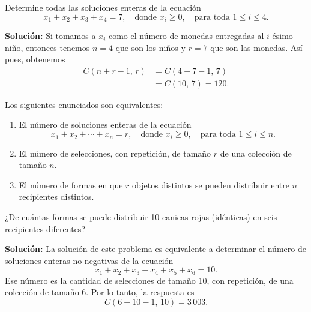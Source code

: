 \begin{myexample}
    Determine todas las soluciones enteras de la ecuación
    $$x_1 + x_2 + x_3 + x_4 = 7, \quad \text{donde } x_i \geq 0, \quad \text{para toda } 1 \leq i \leq 4.$$

    \tcblower
    \textbf{\color{jblueleft}Solución:} Si tomamos a $x_i$ como el número de monedas entregadas al $i$-ésimo niño, entonces tenemos $n = 4$ que son los niños y $r = 7$ que son las monedas. Así pues, obtenemos
    \begin{align*}
        C(n + r - 1, \, r) & = C(4 + 7 - 1, \, 7) \\
        & = C(10, \, 7) = 120.
    \end{align*}
\end{myexample}

\begin{BOX}
    Los siguientes enunciados son equivalentes:
    \begin{enumerate}[label=\alph*)]
        \item El número de soluciones enteras de la ecuación
        $$x_1 + x_2 + \cdots + x_n = r, \quad \text{donde } x_i \geq 0, \quad \text{para toda } 1 \leq i \leq n.$$
        \item El número  de selecciones, con repetición, de tamaño $r$ de una colección de tamaño $n$.
        \item  El número de formas en que $r$ objetos distintos se pueden distribuir entre $n$ recipientes distintos.
    \end{enumerate}
\end{BOX}

\newpage

\begin{myexample}
    ¿De cuántas formas se puede distribuir 10 canicas rojas (idénticas) en seis recipientes diferentes?

    \tcblower
    \textbf{\color{jblueleft}Solución:} La solución de este problema es equivalente a determinar el número de soluciones enteras no negativas de la ecuación
    $$x_1 + x_2 + x_3 + x_4 + x_5 + x_6 = 10.$$
    Ese número es la cantidad de selecciones de tamaño 10, con repetición, de una colección de tamaño 6. Por lo tanto, la respuesta es
    $$C(6 + 10 - 1, \, 10) = 3 \, 003.$$
\end{myexample}

